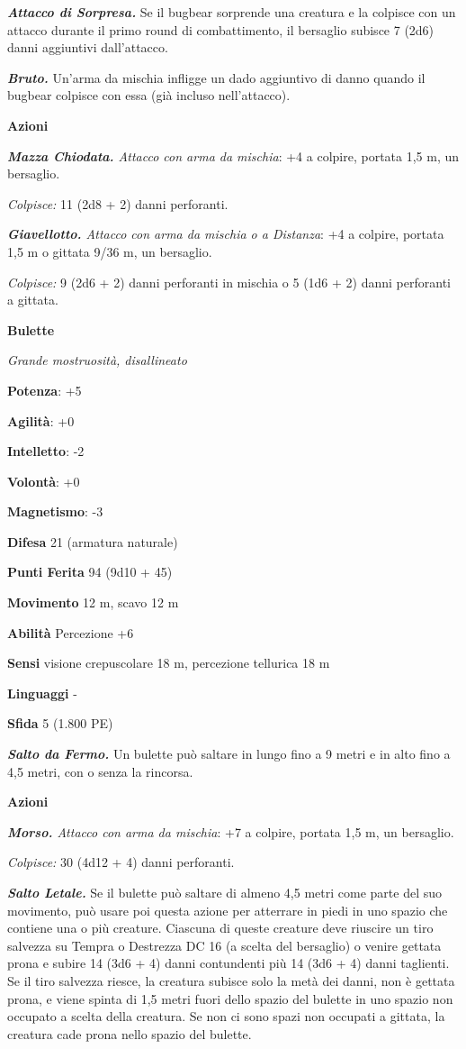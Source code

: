 \begin{multicols}{2}
\emph{\textbf{Attacco di Sorpresa.}} Se il bugbear sorprende una
creatura e la colpisce con un attacco durante il primo round di
combattimento, il bersaglio subisce 7 (2d6) danni aggiuntivi
dall'attacco.

\emph{\textbf{Bruto.}} Un'arma da mischia infligge un dado aggiuntivo di
danno quando il bugbear colpisce con essa (già incluso nell'attacco).

\textbf{Azioni}

\emph{\textbf{Mazza Chiodata.} Attacco con arma da mischia}: +4 a
colpire, portata 1,5 m, un bersaglio.

\emph{Colpisce:} 11 (2d8 + 2) danni perforanti.

\emph{\textbf{Giavellotto.} Attacco con arma da mischia o a Distanza}:
+4 a colpire, portata 1,5 m o gittata 9/36 m, un bersaglio.

\emph{Colpisce:} 9 (2d6 + 2) danni perforanti in mischia o 5 (1d6 + 2)
danni perforanti a gittata.

\textbf{Bulette}

\emph{Grande mostruosità, disallineato}

\textbf{Potenza}: +5

\textbf{Agilità}: +0

\textbf{Intelletto}: -2

\textbf{Volontà}: +0

\textbf{Magnetismo}: -3

\textbf{Difesa} 21 (armatura naturale)

\textbf{Punti Ferita} 94 (9d10 + 45)

\textbf{Movimento} 12 m, scavo 12 m

\textbf{Abilità} Percezione +6

\textbf{Sensi} visione crepuscolare 18 m, percezione tellurica 18 m

\textbf{Linguaggi} -

\textbf{Sfida} 5 (1.800 PE)

\emph{\textbf{Salto da Fermo.}} Un bulette può saltare in lungo fino a 9
metri e in alto fino a 4,5 metri, con o senza la rincorsa.

\textbf{Azioni}

\emph{\textbf{Morso.} Attacco con arma da mischia}: +7 a colpire,
portata 1,5 m, un bersaglio.

\emph{Colpisce:} 30 (4d12 + 4) danni perforanti.

\emph{\textbf{Salto Letale.}} Se il bulette può saltare di almeno 4,5
metri come parte del suo movimento, può usare poi questa azione per
atterrare in piedi in uno spazio che contiene una o più creature.
Ciascuna di queste creature deve riuscire un tiro salvezza su Tempra o
Destrezza DC 16 (a scelta del bersaglio) o venire gettata prona e subire
14 (3d6 + 4) danni contundenti più 14 (3d6 + 4) danni taglienti. Se il
tiro salvezza riesce, la creatura subisce solo la metà dei danni, non è
gettata prona, e viene spinta di 1,5 metri fuori dello spazio del
bulette in uno spazio non occupato a scelta della creatura. Se non ci
sono spazi non occupati a gittata, la creatura cade prona nello spazio
del bulette.


\end{multicols}

